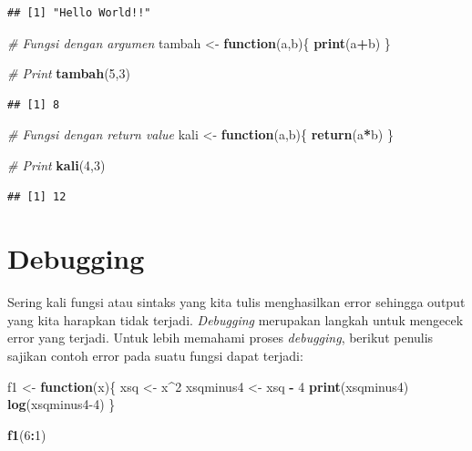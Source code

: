 \documentclass[]{book}
\newenvironment{Shaded}{\begin{snugshade}}{\end{snugshade}}
\newcommand{\CommentTok}[1]{\textcolor[rgb]{0.56,0.35,0.01}{\textit{#1}}}
\newcommand{\ControlFlowTok}[1]{\textcolor[rgb]{0.13,0.29,0.53}{\textbf{#1}}}
\newcommand{\DecValTok}[1]{\textcolor[rgb]{0.00,0.00,0.81}{#1}}
\newcommand{\KeywordTok}[1]{\textcolor[rgb]{0.13,0.29,0.53}{\textbf{#1}}}
\newcommand{\NormalTok}[1]{#1}
\newcommand{\OperatorTok}[1]{\textcolor[rgb]{0.81,0.36,0.00}{\textbf{#1}}}
\newcommand{\StringTok}[1]{\textcolor[rgb]{0.31,0.60,0.02}{#1}}
\theoremstyle{definition}
\theoremstyle{definition}
\theoremstyle{definition}
\theoremstyle{remark}
\begin{document}
\begin{verbatim}
## [1] "Hello World!!"
\end{verbatim}

\begin{Shaded}
\begin{Highlighting}[]
\CommentTok{# Fungsi dengan argumen}
\NormalTok{tambah <-}\StringTok{ }\ControlFlowTok{function}\NormalTok{(a,b)\{}
  \KeywordTok{print}\NormalTok{(a}\OperatorTok{+}\NormalTok{b)}
\NormalTok{\}}

\CommentTok{# Print}
\KeywordTok{tambah}\NormalTok{(}\DecValTok{5}\NormalTok{,}\DecValTok{3}\NormalTok{)}
\end{Highlighting}
\end{Shaded}

\begin{verbatim}
## [1] 8
\end{verbatim}

\begin{Shaded}
\begin{Highlighting}[]
\CommentTok{# Fungsi dengan return value}
\NormalTok{kali <-}\StringTok{ }\ControlFlowTok{function}\NormalTok{(a,b)\{}
  \KeywordTok{return}\NormalTok{(a}\OperatorTok{*}\NormalTok{b)}
\NormalTok{\}}

\CommentTok{# Print}
\KeywordTok{kali}\NormalTok{(}\DecValTok{4}\NormalTok{,}\DecValTok{3}\NormalTok{)}
\end{Highlighting}
\end{Shaded}

\begin{verbatim}
## [1] 12
\end{verbatim}

\hypertarget{debugging}{%
\section{Debugging}\label{debugging}}

Sering kali fungsi atau sintaks yang kita tulis menghasilkan error sehingga output yang kita harapkan tidak terjadi. \emph{Debugging} merupakan langkah untuk mengecek error yang terjadi. Untuk lebih memahami proses \emph{debugging}, berikut penulis sajikan contoh error pada suatu fungsi dapat terjadi:

\begin{Shaded}
\begin{Highlighting}[]
\NormalTok{f1 <-}\StringTok{ }\ControlFlowTok{function}\NormalTok{(x)\{}
\NormalTok{  xsq <-}\StringTok{ }\NormalTok{x}\OperatorTok{^}\DecValTok{2}
\NormalTok{  xsqminus4 <-}\StringTok{ }\NormalTok{xsq }\OperatorTok{-}\StringTok{ }\DecValTok{4}
  \KeywordTok{print}\NormalTok{(xsqminus4)}
  \KeywordTok{log}\NormalTok{(xsqminus4}\DecValTok{-4}\NormalTok{)}
\NormalTok{\}}

\KeywordTok{f1}\NormalTok{(}\DecValTok{6}\OperatorTok{:}\DecValTok{1}\NormalTok{)}
\end{Highlighting}
\end{Shaded}
\end{document}
